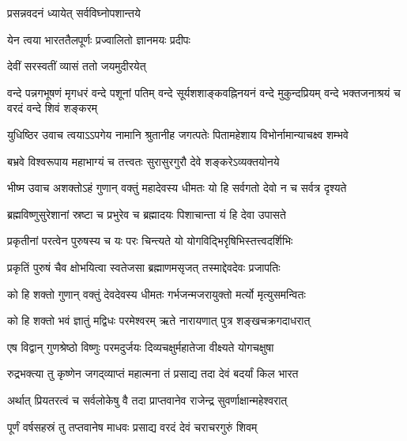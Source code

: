 
{प्रसन्नवदनं ध्यायेत् सर्वविघ्नोपशान्तये}

{येन त्वया भारततैलपूर्णः प्रज्वालितो ज्ञानमयः प्रदीपः}%


{देवीं सरस्वतीं व्यासं ततो जयमुदीरयेत्}


{वन्दे पन्नगभूषणं मृगधरं वन्दे पशूनां पतिम्}
{वन्दे सूर्यशशाङ्कवह्निनयनं वन्दे मुकुन्दप्रियम्}
{वन्दे भक्तजनाश्रयं च वरदं वन्दे शिवं शङ्करम्}


युधिष्ठिर उवाच
\twolineshloka
{त्वयाऽऽपगेय नामानि श्रुतानीह जगत्पतेः}%
{पितामहेशाय विभोर्नामान्याचक्ष्व शम्भवे}%

\twolineshloka
{बभ्रवे विश्वरूपाय महाभाग्यं च तत्त्वतः}%
{सुरासुरगुरौ देवे शङ्करेऽव्यक्तयोनये}%

भीष्म उवाच
\twolineshloka
{अशक्तोऽहं गुणान् वक्तुं महादेवस्य धीमतः}%
{यो हि सर्वगतो देवो न च सर्वत्र दृश्यते}%

\twolineshloka
{ब्रह्मविष्णुसुरेशानां स्रष्टा च प्रभुरेव च}%
{ब्रह्मादयः पिशाचान्ता यं हि देवा उपासते}%

\twolineshloka
{प्रकृतीनां परत्वेन पुरुषस्य च यः परः}%
{चिन्त्यते यो योगविद्भिरृषिभिस्तत्त्वदर्शिभिः}%

\twolineshloka
{प्रकृतिं पुरुषं चैव क्षोभयित्वा स्वतेजसा}%
{ब्रह्माणमसृजत् तस्माद्देवदेवः प्रजापतिः}%


\twolineshloka
{को हि शक्तो गुणान् वक्तुं देवदेवस्य धीमतः}%
{गर्भजन्मजरायुक्तो मर्त्यो मृत्युसमन्वितः}%

\twolineshloka
{को हि शक्तो भवं ज्ञातुं मद्विधः परमेश्वरम्}%
{ऋते नारायणात् पुत्र शङ्खचक्रगदाधरात्}%

\twolineshloka
{एष विद्वान् गुणश्रेष्ठो विष्णुः परमदुर्जयः}%
{दिव्यचक्षुर्महातेजा वीक्ष्यते योगचक्षुषा}%

\twolineshloka
{रुद्रभक्त्या तु कृष्णेन जगद्‌व्याप्तं महात्मना}%
{तं प्रसाद्य तदा देवं बदर्यां किल भारत}%

\twolineshloka
{अर्थात् प्रियतरत्वं च सर्वलोकेषु वै तदा}%
{प्राप्तवानेव राजेन्द्र सुवर्णाक्षान्महेश्वरात्}%

\twolineshloka
{पूर्णं वर्षसहस्रं तु तप्तवानेष माधवः}%
{प्रसाद्य वरदं देवं चराचरगुरुं शिवम्}%

